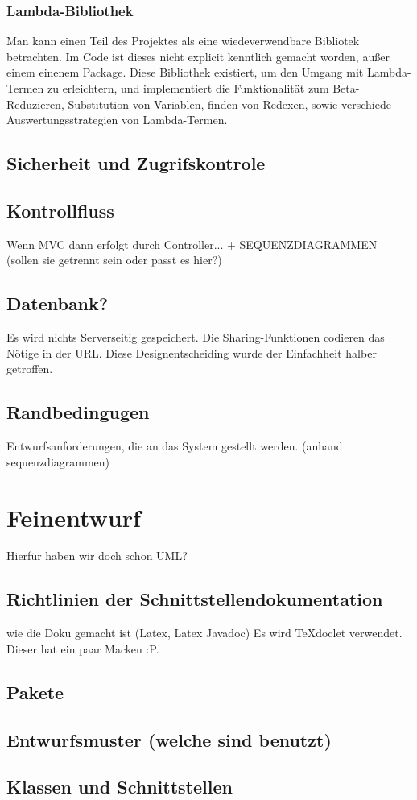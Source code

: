 \documentclass[parskip=full,11pt,twoside]{scrartcl}
\begin{document}
\subsubsection{Lambda-Bibliothek}
Man kann einen Teil des Projektes als eine wiedeverwendbare Bibliotek betrachten. Im Code ist dieses nicht
explicit kenntlich gemacht worden, außer einem einenem Package.
Diese Bibliothek existiert, um den Umgang mit Lambda-Termen zu erleichtern, und implementiert die
Funktionalität zum Beta-Reduzieren, Substitution von Variablen, finden von Redexen, sowie verschiede Auswertungsstrategien von Lambda-Termen.


\subsection{Sicherheit und Zugrifskontrole}
\subsection{Kontrollfluss}
Wenn MVC dann erfolgt durch Controller...  + SEQUENZDIAGRAMMEN (sollen sie getrennt sein oder passt es hier?)
\subsection{Datenbank?}
Es wird nichts Serverseitig gespeichert. Die Sharing-Funktionen codieren das Nötige in der URL.
Diese Designentscheiding wurde der Einfachheit halber getroffen.
\subsection{Randbedingugen}
Entwurfsanforderungen, die an das System gestellt werden. (anhand sequenzdiagrammen)
\pagebreak

\section{Feinentwurf}
Hierfür haben wir doch schon UML?
\subsection{Richtlinien der Schnittstellendokumentation}
wie die Doku gemacht ist (Latex, Latex Javadoc)
Es wird TeXdoclet verwendet. Dieser hat ein paar Macken :P.
\subsection{Pakete}
\subsection{Entwurfsmuster (welche sind benutzt)}
\subsection{Klassen und Schnittstellen}
\pagebreak
\end{document}
